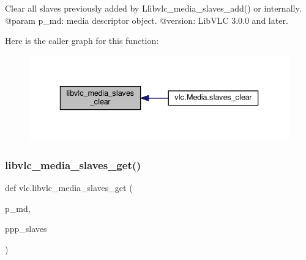 \begin{DoxyVerb}Clear all slaves previously added by L{libvlc_media_slaves_add}() or
internally.
@param p_md: media descriptor object.
@version: LibVLC 3.0.0 and later.
\end{DoxyVerb}
 Here is the caller graph for this function\+:
\nopagebreak
\begin{figure}[H]
\begin{center}
\leavevmode
\includegraphics[width=336pt]{namespacevlc_ad3b2622646a9b47d26c66d7ba9ba8759_icgraph}
\end{center}
\end{figure}
\mbox{\label{namespacevlc_a8e0842606e258c50d03baa1ecae992b3}} 
\subsubsection{\texorpdfstring{libvlc\+\_\+media\+\_\+slaves\+\_\+get()}{libvlc\_media\_slaves\_get()}}
{\footnotesize\ttfamily def vlc.\+libvlc\+\_\+media\+\_\+slaves\+\_\+get (\begin{DoxyParamCaption}\item[{}]{p\+\_\+md,  }\item[{}]{ppp\+\_\+slaves }\end{DoxyParamCaption})}

